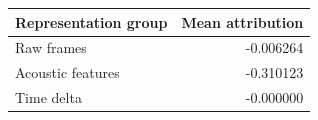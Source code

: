 \begin{tabular}{lr}
\hline
Representation group & Mean attribution \\
\hline
Raw frames & -0.006264 \\
Acoustic features & -0.310123 \\
Time delta & -0.000000 \\
\hline
\end{tabular}
